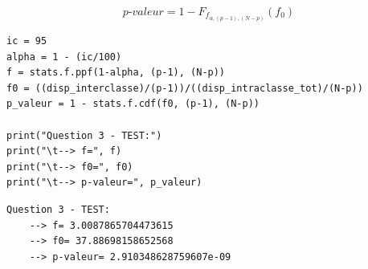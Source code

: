 \begin{enumerate}
\begin{itemize}
            \begin{equation}
                \textit{p-valeur} = 1 - F_{f_{\alpha, (p-1), (N-p)}}(f_{0})
            \end{equation}    
    \end{itemize}
        \vspace{.2cm}

\begin{lstlisting}[style=myPython, caption=Code Python question 3, frame=lines]
ic = 95
alpha = 1 - (ic/100)
f = stats.f.ppf(1-alpha, (p-1), (N-p))
f0 = ((disp_interclasse)/(p-1))/((disp_intraclasse_tot)/(N-p))
p_valeur = 1 - stats.f.cdf(f0, (p-1), (N-p))

print("Question 3 - TEST:")
print("\t--> f=", f)
print("\t--> f0=", f0)
print("\t--> p-valeur=", p_valeur)
\end{lstlisting}

\begin{lstlisting}[style=myLog, caption=Résultat du code, frame=lines]
Question 3 - TEST:
    --> f= 3.0087865704473615
    --> f0= 37.88698158652568
    --> p-valeur= 2.910348628759607e-09
\end{lstlisting}



\end{enumerate}
